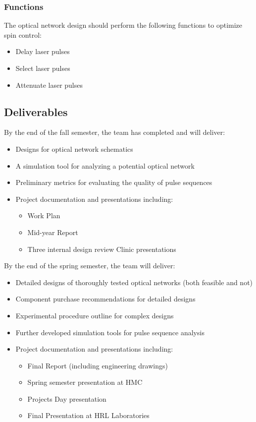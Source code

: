 \documentclass[pdftex,12pt,a4paper]{article}
\begin{document}
\subsubsection{Functions}
The optical network design should perform the following functions to optimize spin control:
\begin{itemize}
\item Delay laser pulses
\item Select laser pulses
\item Attenuate laser pulses
\end{itemize}

\subsection{Deliverables}
By the end of the fall semester, the team has completed and will deliver:
\begin{itemize}
\item Designs for optical network schematics
\item A simulation tool for analyzing a potential optical network
\item Preliminary metrics for evaluating the quality of pulse sequences
\item Project documentation and presentations including:
\begin{itemize}
\item Work Plan
\item Mid-year Report
\item Three internal design review Clinic presentations
\end{itemize}
\end{itemize}
By the end of the spring semester, the team will deliver:
\begin{itemize}
\item Detailed designs of thoroughly tested optical networks (both feasible and not)
\item Component purchase recommendations for detailed designs
\item Experimental procedure outline for complex designs
\item Further developed simulation tools for pulse sequence analysis
\item Project documentation and presentations including:
\begin{itemize}
\item Final Report (including engineering drawings)
\item Spring semester presentation at HMC
\item Projects Day presentation
\item Final Presentation at HRL Laboratories
\end{itemize}
\end{itemize}
\end{document}
